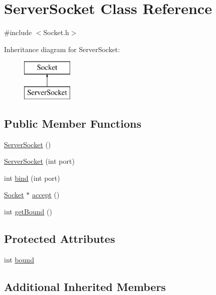 \hypertarget{classServerSocket}{}\section{Server\+Socket Class Reference}
\label{classServerSocket}


{\ttfamily \#include $<$Socket.\+h$>$}

Inheritance diagram for Server\+Socket\+:\begin{figure}[H]
\begin{center}
\leavevmode
\includegraphics[height=2.000000cm]{classServerSocket}
\end{center}
\end{figure}
\subsection*{Public Member Functions}
\begin{DoxyCompactItemize}
\item 
\hyperlink{classServerSocket_a2b3098589541243241ca25495155186c}{Server\+Socket} ()
\item 
\hyperlink{classServerSocket_a3dc1a31f740e4a8d69ae10c5dcb547d6}{Server\+Socket} (int port)
\item 
int \hyperlink{classServerSocket_a6cd7ad5bd162805cb4fa9f126205e046}{bind} (int port)
\item 
\hyperlink{classSocket}{Socket} $\ast$ \hyperlink{classServerSocket_accc3d56d42aa50a5f3c920cf0b26959b}{accept} ()
\item 
int \hyperlink{classServerSocket_a3eac38fb0cc7686f758f1bc77e1b1f6b}{get\+Bound} ()
\end{DoxyCompactItemize}
\subsection*{Protected Attributes}
\begin{DoxyCompactItemize}
\item 
int \hyperlink{classServerSocket_ae7e043fe5c2a7abdcc3d83219fe5106f}{bound}
\end{DoxyCompactItemize}
\subsection*{Additional Inherited Members}


